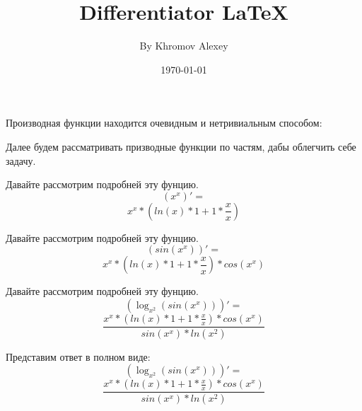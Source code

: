 \documentclass[a4paper,12pt]{article}
\author{By Khromov Alexey}
\title{Differentiator \LaTeX{}}
\date{\today}
\begin{document}
\maketitle
\newpage
Производная функции находится очевидным и нетривиальным способом:

Далее будем рассматривать призводные функции по частям, дабы облегчить себе задачу.

Давайте рассмотрим подробней эту фунцию.
\begin{equation}
\left( {x }^ {x }\right)' =
\end{equation}
\begin{equation}
{{x }^ {x }}* {\left( {{ln \left( {x }\right) }* {1 }}+ {{1 }* {\frac{{x }}{{x }}}}\right) }
\end{equation}

Давайте рассмотрим подробней эту фунцию.
\begin{equation}
\left( sin \left( {{x }^ {x }}\right) \right)' =
\end{equation}
\begin{equation}
{{{x }^ {x }}* {\left( {{ln \left( {x }\right) }* {1 }}+ {{1 }* {\frac{{x }}{{x }}}}\right) }}* {cos \left( {{x }^ {x }}\right) }
\end{equation}

Давайте рассмотрим подробней эту фунцию.
\begin{equation}
\left( \log_{{x }^ {2 }}\left( {sin \left( {{x }^ {x }}\right) }\right) \right)' =
\end{equation}
\begin{equation}
\frac{{{{{x }^ {x }}* {\left( {{ln \left( {x }\right) }* {1 }}+ {{1 }* {\frac{{x }}{{x }}}}\right) }}* {cos \left( {{x }^ {x }}\right) }}}{{{sin \left( {{x }^ {x }}\right) }* {ln \left( {{x }^ {2 }}\right) }}}
\end{equation}

Представим ответ в полном виде:
\begin{equation}
\left( \log_{{x }^ {2 }}\left( {sin \left( {{x }^ {x }}\right) }\right) \right)' =
\end{equation}
\begin{equation}
\frac{{{{{x }^ {x }}* {\left( {{ln \left( {x }\right) }* {1 }}+ {{1 }* {\frac{{x }}{{x }}}}\right) }}* {cos \left( {{x }^ {x }}\right) }}}{{{sin \left( {{x }^ {x }}\right) }* {ln \left( {{x }^ {2 }}\right) }}}
\end{equation}
\end{document}
